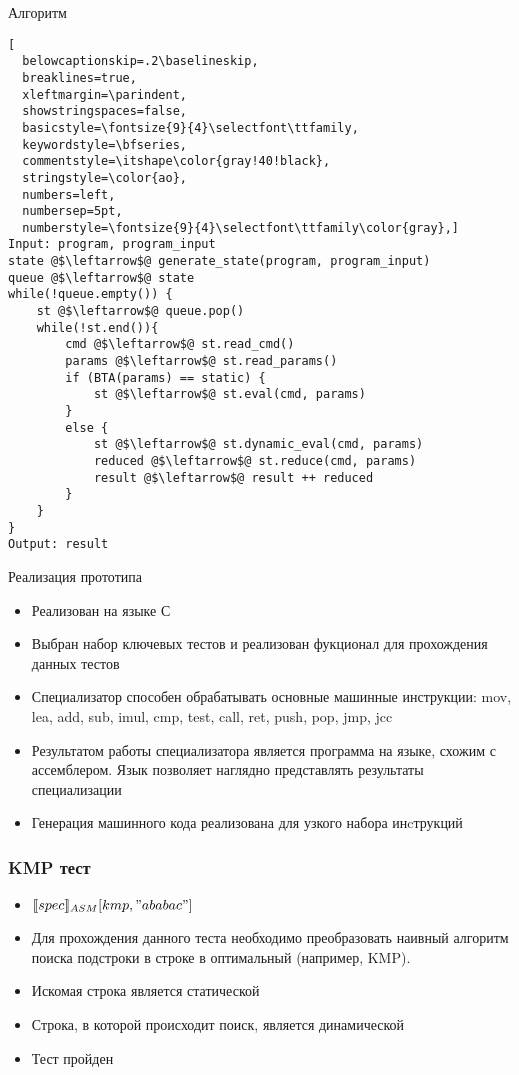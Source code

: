 \documentclass{beamer}
\begin{document}
\lstset{language=C}
\begin{frame}[fragile]{Алгоритм}
\begin{lstlisting}[
  belowcaptionskip=.2\baselineskip,
  breaklines=true,
  xleftmargin=\parindent,
  showstringspaces=false,
  basicstyle=\fontsize{9}{4}\selectfont\ttfamily,
  keywordstyle=\bfseries,
  commentstyle=\itshape\color{gray!40!black},
  stringstyle=\color{ao},
  numbers=left,
  numbersep=5pt,
  numberstyle=\fontsize{9}{4}\selectfont\ttfamily\color{gray},]
Input: program, program_input
state @$\leftarrow$@ generate_state(program, program_input)
queue @$\leftarrow$@ state
while(!queue.empty()) {
    st @$\leftarrow$@ queue.pop()
    while(!st.end()){
        cmd @$\leftarrow$@ st.read_cmd()
        params @$\leftarrow$@ st.read_params()
        if (BTA(params) == static) {
            st @$\leftarrow$@ st.eval(cmd, params)
        }
        else {
            st @$\leftarrow$@ st.dynamic_eval(cmd, params)
            reduced @$\leftarrow$@ st.reduce(cmd, params)
            result @$\leftarrow$@ result ++ reduced
        }
    }
}
Output: result
\end{lstlisting}
\end{frame}

\begin{frame}{Реализация прототипа}
\begin{itemize}
\vfill
\item Реализован на языке С
\vfill
\item Выбран набор ключевых тестов и реализован фукционал для прохождения данных тестов
\vfill
\item Специализатор способен обрабатывать основные машинные инструкции: mov, lea, add, sub, imul, cmp, test, call, ret, push, pop, jmp, jcc
\vfill
\item Результатом работы специализатора является программа на языке, схожим с ассемблером. Язык позволяет наглядно представлять результаты специализации 
\vfill
\item Генерация машинного кода реализована для узкого набора инcтрукций
\vfill
\end{itemize}
\end{frame}

\lstset{language=C}
\begin{frame}[fragile]\frametitle{KMP тест }
\begin{itemize}
\item $\llbracket spec \rrbracket_{ASM}[kmp, "ababac"]$
\vfill
\item Для прохождения данного теста необходимо преобразовать наивный алгоритм поиска подстроки в строке в оптимальный (например, KMP).
\vfill
\item Искомая строка является \color{ao} статической \color{black}
\vfill
\item Строка, в которой происходит поиск, является \color{red} динамической \color{black}
\vfill
\item Тест пройден 
\end{itemize}

\end{frame}
\end{document}
